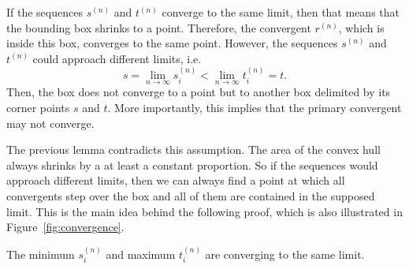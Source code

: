 If the sequences $s^{(n)}$ and $t^{(n)}$ converge to the same limit,
then that means that the bounding box shrinks to a point.
Therefore, the convergent $r^{(n)}$, which is inside this box, converges to the
same point.
However, the sequences $s^{(n)}$ and $t^{(n)}$ could approach different limits, i.e.
\[
  s = \lim_{n → ∞} s_i^{(n)} < \lim_{n → ∞} t_i^{(n)} = t.
\]
Then, the box does not converge to a point but to another box delimited
by its corner points $s$ and $t$.
More importantly, this implies that the primary convergent may not converge.

The previous lemma contradicts this assumption.
The area of the convex hull always shrinks by a at least a constant proportion.
So if the sequences would approach different limits, then we can always find a
point at which all convergents step over the box and all of them are contained
in the supposed limit.
This is the main idea behind the following proof,
which is also illustrated in Figure~\ref{fig:convergence}.

\pagebreak
\begin{lemma}
  \label{lem:min-max-conv}
  The minimum $s_i^{(n)}$ and maximum $t_i^{(n)}$ are converging to the same
  limit.
\end{lemma}

